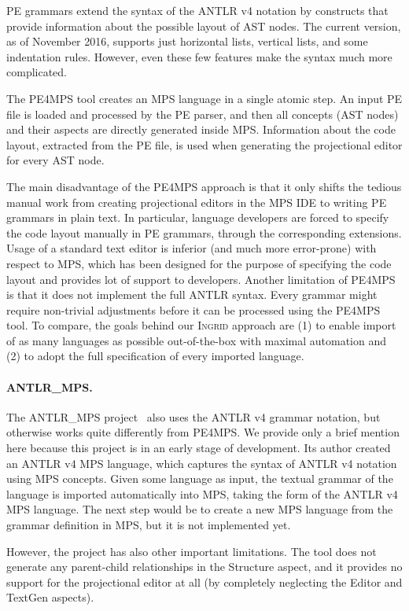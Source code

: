 PE grammars extend the syntax of the ANTLR v4 notation by constructs that provide information about the possible layout of AST nodes.
The current version, as of November 2016, supports just horizontal lists, vertical lists, and some indentation rules.
However, even these few features make the syntax much more complicated.

The PE4MPS tool creates an MPS language in a single atomic step.
An input PE file is loaded and processed by the PE parser, and then all concepts (AST nodes) and their aspects are directly generated inside MPS.
Information about the code layout, extracted from the PE file, is used when generating the projectional editor for every AST node.

The main disadvantage of the PE4MPS approach is that it only shifts the tedious manual work from creating projectional editors in the MPS IDE to writing PE grammars in plain text.
In particular, language developers are forced to specify the code layout manually in PE grammars, through the corresponding extensions.
Usage of a standard text editor is inferior (and much more error-prone) with respect to MPS, which has been designed for the purpose of specifying the code layout and provides lot of support to developers.
Another limitation of PE4MPS is that it does not implement the full ANTLR syntax.
Every grammar might require non-trivial adjustments before it can be processed using the PE4MPS tool.
To compare, the goals behind our \textsc{Ingrid} approach are (1) to enable import of as many languages as possible out-of-the-box with maximal automation and (2) to adopt the full specification of every imported language.

\paragraph{ANTLR{\_}MPS.}
The ANTLR{\_}MPS project~\cite{ref:ANTLR2MPS} also uses the ANTLR v4 grammar notation, but otherwise works quite differently from PE4MPS.
We provide only a brief mention here because this project is in an early stage of development.
Its author created an ANTLR v4 MPS language, which captures the syntax of ANTLR v4 notation using MPS concepts.
Given some language as input, the textual grammar of the language is imported automatically into MPS, taking the form of the ANTLR v4 MPS language.
The next step would be to create a new MPS language from the grammar definition in MPS, but it is not implemented yet.

However, the project has also other important limitations.
The tool does not generate any parent-child relationships in the Structure aspect, and it provides no support for the projectional editor at all (by completely neglecting the Editor and TextGen aspects).

